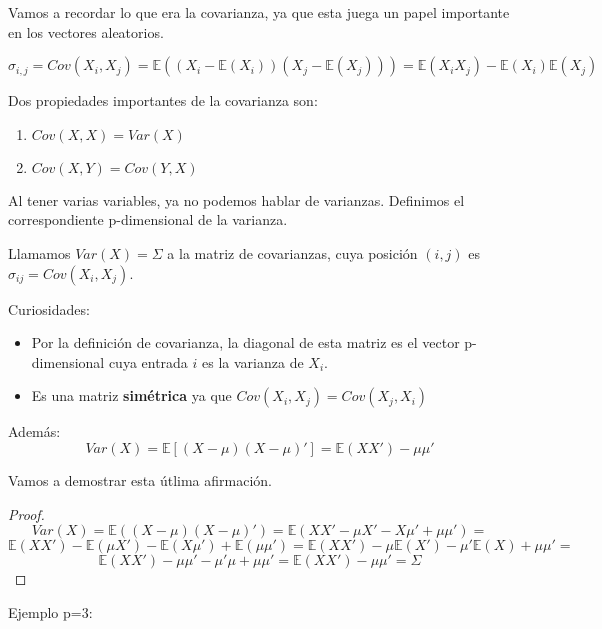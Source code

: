 Vamos a recordar lo que era la covarianza, ya que esta juega un papel importante en los vectores aleatorios.

\begin{defn}[Covarianza]
\[\sigma_{i,j} = Cov(X_i,X_j) = \mathbb{E}\left((X_i-\mathbb{E}(X_i))(X_j-\mathbb{E}(X_j))\right) = \mathbb{E}(X_i X_j)-\mathbb{E}(X_i)\mathbb{E}(X_j)\]

Dos propiedades importantes de la covarianza son:

\begin{enumerate}
\item $Cov(X,X)= Var(X)$
\item $Cov(X,Y)=Cov(Y,X)$
\end{enumerate}

\end{defn}

Al tener varias variables, ya no podemos hablar de varianzas. Definimos el correspondiente p-dimensional de la varianza.


\begin{defn}
	Llamamos $Var(X) = Σ$ a la matriz de covarianzas, cuya posición $(i,j)$ es $σ_{ij} = Cov(X_i,X_j)$.


	Curiosidades:

	\begin{itemize}
		\item Por la definición de covarianza, la diagonal de esta matriz es el vector p-dimensional cuya entrada $i$ es la varianza de $X_i$.
		\item Es una matriz \textbf{simétrica} ya que $Cov(X_i,X_j) = Cov(X_j,X_i)$

	\end{itemize}

	Además: \[Var(X) = \mathbb{E}[(X-μ)(X-μ)'] = \mathbb{E}(XX')-μμ'\]

\end{defn}

Vamos a demostrar esta útlima afirmación.

\begin{proof}
\[
Var(X)=\mathbb{E}\left((X-\mu)(X-\mu)'\right) = \mathbb{E}(XX'- \mu X' - X \mu'+\mu \mu')=
\]
\[
\mathbb{E}(XX')-\mathbb{E}(\mu X')-\mathbb{E}(X\mu')+\mathbb{E}(\mu \mu')= \mathbb{E}(XX')-\mu \mathbb{E}(X')-\mu' \mathbb{E}(X)+\mu\mu'=
\]
\[
 \mathbb{E}(XX')-\mu \mu'-\mu' \mu+\mu \mu' = \mathbb{E}(XX')-\mu \mu'=\Sigma
\]
\end{proof}

Ejemplo p=3:

